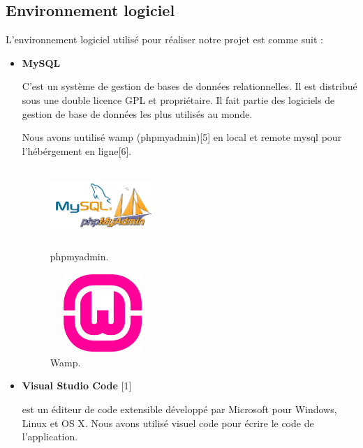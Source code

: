  \subsection{Environnement logiciel}


L'environnement logiciel utilis\'{e} pour r\'{e}aliser notre projet est comme suit : \newline

\begin{itemize}



\item {  \textbf{MySQL} }


C'est un syst\`{e}me de gestion de bases de données relationnelles. Il est distribu\'{e}
sous une double licence GPL et propri\'{e}taire. Il fait partie des logiciels de gestion
de base de donn\'{e}es les plus utilis\'{e}s au monde.

Nous avons uutilis\'{e} wamp (phpmyadmin)[5]  en local et remote mysql pour l'h\'{e}b\'{e}rgement en ligne[6]. \newline



\FloatBarrier
\begin{figure}[H]
\center
\includegraphics[width=4cm,height=3cm]{./figures/teklogos/phpmyadmin.png}
\caption{phpmyadmin.}
\end{figure}
\FloatBarrier

\FloatBarrier
\begin{figure}[H]
\center
\includegraphics[width=4cm,height=3cm]{./figures/teklogos/wamp.png}
\caption{Wamp.}
\end{figure}
\FloatBarrier

\item {  \textbf{Visual Studio Code} } [1]

est un \'{e}diteur de code extensible d\'{e}velopp\'{e} par Microsoft pour Windows,
Linux et OS X.
Nous avons utilis\'{e} visuel code pour \'{e}crire le code de l'application. \newline



\end{itemize}
